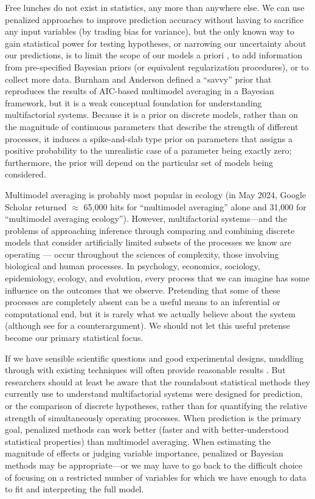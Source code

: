 \documentclass[entropy,article,accept,pdftex,moreauthors]{Definitions/mdpi}
\begin{document}
Free lunches do not exist in statistics, any more than anywhere else. We
can use penalized approaches to improve prediction accuracy without
having to sacrifice any input variables (by trading bias for variance),
but the only known way to gain statistical power for testing hypotheses,
or narrowing our uncertainty about our predictions, is to limit the
scope of our models {a priori} \cite{ref-harrell_regression_2001}, to add information
from pre-specified Bayesian priors (or equivalent regularization
procedures), or to collect more data. Burnham and Anderson \cite{ref-burnhamMultimodel2004b}
defined a ``savvy'' prior that reproduces the results of AIC-based
multimodel averaging in a Bayesian framework, but it is a weak
conceptual foundation for understanding multifactorial systems. Because
it is a prior on discrete models, rather than on the magnitude of
continuous parameters that describe the strength of different processes,
it induces a spike-and-slab type prior on parameters that assigns a
positive probability to the unrealistic case of a parameter being
exactly zero; furthermore, the prior will depend on the particular set
of models being considered.

Multimodel averaging is probably most popular in ecology (in May 2024,
Google Scholar returned \(\approx\) 65,000 hits for ``multimodel
averaging'' alone and 31,000 for ``multimodel averaging ecology'').
However, multifactorial systems---and the problems of approaching
inference through comparing and combining discrete models that consider
artificially limited subsets of the processes we know are operating ---
occur throughout the sciences of complexity, those involving biological
and human processes. In psychology, economics, sociology, epidemiology,
ecology, and evolution, every process that we can imagine has
{some} influence on the outcomes that we observe. Pretending that
some of these processes are completely absent can be a useful means to
an inferential or computational end, but it is rarely what we actually
believe about the system (although see \cite{ref-mundryIssues2011} for a
counterargument). We should not let this useful pretense become our
primary statistical focus.

If we have sensible scientific questions and good experimental designs,
muddling through with existing techniques will often provide reasonable
results \cite{ref-murtaugh_performance_2009}. But researchers should at least be aware that
the roundabout statistical methods they currently use to understand
multifactorial systems were designed for prediction, or the comparison
of discrete hypotheses, rather than for quantifying the relative
strength of simultaneously operating processes. When prediction is the
primary goal, penalized methods can work better (faster and with
better-understood statistical properties) than multimodel averaging.
When estimating the magnitude of effects or judging variable importance,
penalized or Bayesian methods may be appropriate---or we may have to
go back to the difficult choice of focusing on a restricted number of
variables for which we have enough to data to fit and interpreting the
full model.
\end{document}
